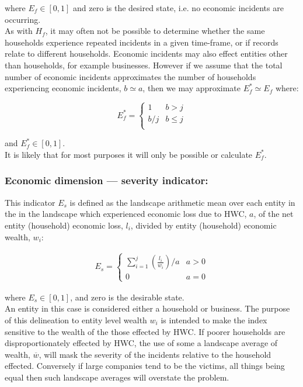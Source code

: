 \documentclass[fleqn,10pt]{olplainarticle}
\begin{document}
where $E_f \in [0,1]$ and zero is the desired state, i.e. no economic incidents are occurring.\\

As with $H_f$, it may often not be possible to determine whether the same households experience repeated incidents in a given time-frame, or if records relate to different households. Economic incidents may also effect entities other than households, for example businesses. However if we assume that the total number of economic incidents approximates the number of households experiencing economic incidents, $b \simeq a$, then we may approximate $E_f^\ast \simeq E_f$ where:

\begin{equation*}
    E_f^\ast = \begin{cases}
        1        & b > j \\
        b/j  & b \le j \\
    \end{cases}
\end{equation*}

and $E_f^\ast \in [0,1]$.\\

It is likely that for most purposes it will only be possible or calculate $E_f^\ast$.

\subsubsection*{Economic dimension --- severity indicator:}
This indicator $E_s$ is defined as the landscape arithmetic mean over each entity in the in the landscape which experienced economic loss due to HWC, $a$, of the net entity (household) economic loss, $l_i$, divided by entity (household) economic wealth, $w_i$:

\begin{align*}
    E_s = \begin{cases}
        \sum_{i=1}^{j}(\frac{l_i}{w_i})/a & a > 0 \\
        0                                     & a = 0
    \end{cases}
\end{align*}

where $E_s \in [0,1]$, and zero is the desirable state. \\ 

An entity in this case is considered either a household or business. The purpose of this delineation to entity level wealth $w_i$ is intended to make the index sensitive to the wealth of the those effected by HWC. If poorer households are disproportionately effected by HWC, the use of some a landscape average of wealth, $\overline{w}$, will mask the severity of the incidents relative to the household effected. Conversely if large companies tend to be the victims, all things being equal then such landscape averages will overstate the problem. \\
\end{document}
